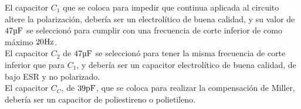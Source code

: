 El capacitor $C_{1}$ que se coloca para impedir que continua aplicada al circuito altere la polarización, debería ser un electrolítico de buena calidad, y su valor de $47 \si[per-mode=symbol]{\micro\farad}$ se seleccionó para cumplir con una frecuencia de corte inferior de como máximo $20 \si[per-mode=symbol]{\hertz}$. \\

El capacitor $C_{2}$ de $47 \si[per-mode=symbol]{\micro\farad}$ se seleccionó para tener la misma frecuencia de corte inferior que para $C_{1}$, y debería ser un capacitor electrolítico de buena calidad, de bajo ESR y no polarizado. \\

El capacitor $C_{C}$, de $39 \si[per-mode=symbol]{\pico\farad}$, que se coloca para realizar la compensación de Miller, debería ser un capacitor de poliestireno o polietileno.


